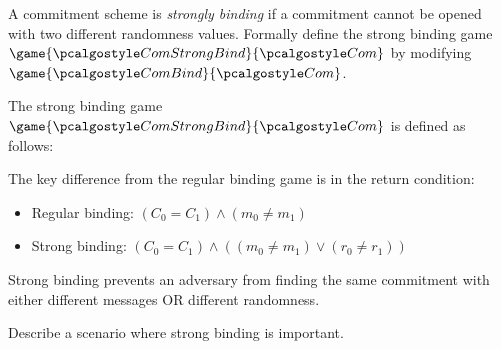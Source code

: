 \begin{exercise}
  A commitment scheme is \emph{strongly binding} if a commitment cannot be opened with two different randomness values.
  Formally define the strong binding game $\game{\algo{ComStrongBind}}{\algo{Com}}$ by modifying $\game{\algo{ComBind}}{\algo{Com}}$.
\end{exercise}

\ifsolutions
\begin{mysolution}
  The strong binding game $\game{\algo{ComStrongBind}}{\algo{Com}}$ is defined as follows:
  
  \begin{center}
    \begin{tcolorbox}[width=8cm]
      \begin{pchstack}[center]
      \end{pchstack}
    \end{tcolorbox}
  \end{center}
  
  The key difference from the regular binding game is in the return condition:
  \begin{itemize}
    \item Regular binding: $(C_0 = C_1) \wedge (m_0 \neq m_1)$
    \item Strong binding: $(C_0 = C_1) \wedge ((m_0 \neq m_1) \vee (r_0 \neq r_1))$
  \end{itemize}
  
  Strong binding prevents an adversary from finding the same commitment with either different messages OR different randomness.
\end{mysolution}
\fi

\begin{exercise}[Optional]
  Describe a scenario where strong binding is important.
\end{exercise}

